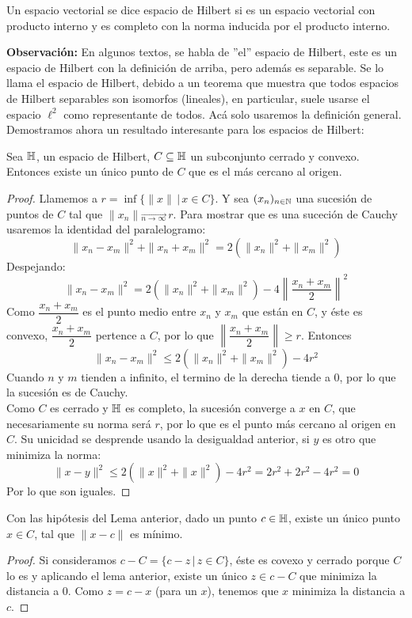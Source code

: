 \documentclass[12pt,a4paper]{book}
\begin{document}
\begin{defi} Un espacio vectorial se dice espacio de Hilbert si es un espacio vectorial con producto interno y es completo con la norma inducida por el producto interno.
\end{defi}
\textbf{Observación:} En algunos textos, se habla de ''el'' espacio de Hilbert, este es un espacio de Hilbert con la definición de arriba, pero además es separable. Se lo llama el espacio de Hilbert, debido a un teorema que muestra que todos espacios de Hilbert separables son isomorfos (lineales), en particular, suele usarse el espacio $\ell^2$ como representante de todos. Acá solo usaremos la definición general.\\
Demostramos ahora un resultado interesante para los espacios de Hilbert:
\begin{lem}
Sea $\mathbb{H}$, un espacio de Hilbert, $C \subseteq \mathbb{H}$ un subconjunto cerrado y convexo. Entonces existe un único punto de $C$ que es el más cercano al origen.
\begin{proof}
Llamemos a $r = \inf \{ \|x\| \,\vert\, x \in C\} $. Y sea $(x_n)_{n \in \mathbb{N}}$ una sucesión de puntos de $C$ tal que $\displaystyle \| x_n \| \overrightarrow{_{n \rightarrow \infty} } \, r$. Para mostrar que es una suceción de Cauchy usaremos la identidad del paralelogramo:
$$ \| x_n - x_m \|^ 2 + \|x_n + x_m \|^2 = 2 (\|x_n\|^2 + \|x_m\|^2)$$
Despejando:
$$\|x_n - x_m\|^2 = 2 (\|x_n\|^2 + \|x_m\|^2) - 4\left\| \frac{x_n + x_m}{2} \right\|^2$$
Como $\dfrac{x_n + x_m}{2}$ es el punto medio entre $x_n$ y $x_m$ que están en $C$, y éste es convexo, $\dfrac{x_n + x_m}{2}$ pertence a $C$, por lo que $\left\| \dfrac{x_n + x_m}{2} \right\| \geq r$. Entonces
$$\|x_n - x_m\|^2 \leq 2 (\|x_n\|^2 + \|x_m\|^2) - 4r^2$$
Cuando $n$ y $m$ tienden a infinito, el termino de la derecha tiende a 0, por lo que la sucesión es de Cauchy.\\
Como $C$ es cerrado y $\mathbb{H}$ es completo, la sucesión converge a $x$ en $C$, que necesariamente su norma será $r$, por lo que es el punto más cercano al origen en $C$. Su unicidad se desprende usando la desigualdad anterior, si $y$ es otro que minimiza la norma:
$$\|x - y\|^2 \leq 2 (\|x\|^2 + \|x\|^2) - 4r^2 = 2r^2+2r^2 - 4r^2 =0$$
Por lo que son iguales.
\end{proof}
\end{lem}
\begin{cor}
Con las hipótesis del Lema anterior, dado un punto $c \in \mathbb{H}$, existe un único punto $x \in C$, tal que $\|x - c\|$ es mínimo.
\begin{proof}
Si consideramos $ c - C = \{ c - z \,\vert\, z \in C\}$, éste es covexo y cerrado porque $C$ lo es y aplicando el lema anterior, existe un único $z \in  c- C$ que minimiza la distancia a 0. Como $z = c- x$ (para un $x$), tenemos que $x$ minimiza la distancia a $c$.
\end{proof}
\end{cor}
\end{document}
